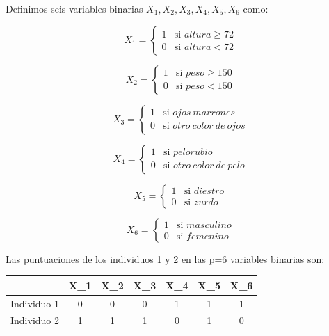 \documentclass[a4paper, 20pt]{article}
\begin{document}
Definimos seis variables binarias $X_1,X_2,X_3,X_4,X_5,X_6$ como:

$$X_1 = \left \{ \begin{matrix} 1 & \mbox{si } altura \geq 72 
\\ 0 & \mbox{si } altura < 72 \end{matrix}\right.   $$

$$X_2 = \left \{ \begin{matrix} 1 & \mbox{si } peso \geq 150 
\\ 0 & \mbox{si } peso < 150 \end{matrix}\right.   $$

$$X_3 = \left \{ \begin{matrix} 1 & \mbox{si } ojos \ marrones 
\\ 0 & \mbox{si } otro\ color\ de \ ojos\end{matrix}\right.   $$

$$X_4 = \left \{ \begin{matrix} 1 & \mbox{si } pelo rubio
\\ 0 & \mbox{si } otro\ color\ de\ pelo \end{matrix}\right.   $$

$$X_5 = \left \{ \begin{matrix} 1 & \mbox{si } diestro
\\ 0 & \mbox{si } zurdo \end{matrix}\right.   $$

$$X_6 = \left \{ \begin{matrix} 1 & \mbox{si } masculino
\\ 0 & \mbox{si } femenino \end{matrix}\right.   $$

Las puntuaciones de los individuos 1 y 2 en las p=6 variables binarias son:

\begin{table}[]
\begin{tabular}{l|cccccc}
            & \multicolumn{1}{l}{X\_1} & \multicolumn{1}{l}{X\_2} & \multicolumn{1}{l}{X\_3} & \multicolumn{1}{l}{X\_4} & \multicolumn{1}{l}{X\_5} & \multicolumn{1}{l}{X\_6} \\ \hline
Individuo 1 & 0                        & 0                        & 0                        & 1                        & 1                        & 1                        \\
Individuo 2 & 1                        & 1                        & 1                        & 0                        & 1                        & 0                       
\end{tabular}
\end{table}
\end{document}
